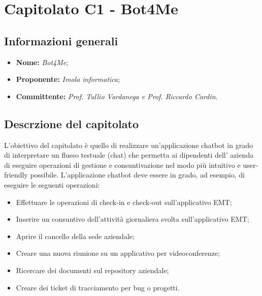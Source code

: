 \section{Capitolato C1 - Bot4Me}\label{section:c1}

\subsection{Informazioni generali}
	\begin {itemize}
		\item \textbf{Nome:} \textit{Bot4Me};
		\item \textbf{Proponente:} \textit{Imola informatica};
		\item \textbf{Committente:} \textit{Prof. Tullio Vardanega e Prof. Riccardo Cardin}.
	\end{itemize}

	\subsection{Descrzione del capitolato}
		L’obiettivo del capitolato è quello di realizzare un'applicazione chatbot in grado di interpretare un flusso testuale (chat) che permetta ai dipendenti dell' azienda di eseguire operazioni di gestione e consuntivazione nel modo più intuitivo e user-friendly possibile.
		L'applicazione chatbot deve essere in grado, ad esempio,  di eseguire le seguenti operazioni:
		\begin {itemize}
			\item Effettuare le operazioni di check-in e check-out sull’applicativo EMT;
			\item Inserire un consuntivo dell’attività giornaliera svolta sull’applicativo EMT;
			\item Aprire il cancello della sede aziendale;
			\item Creare una nuova riunione su un applicativo per videoconferenze;
			\item Ricercare dei documenti sul repository aziendale;
			\item Creare dei ticket di tracciamento per bug o progetti.
		\end{itemize}

